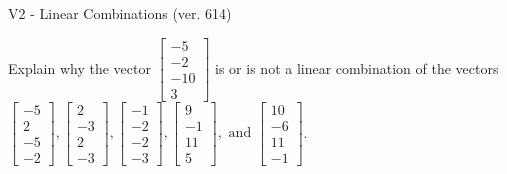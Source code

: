 \begin{exercise}
  \begin{exerciseTitle}V2 - Linear Combinations (ver. 614)\end{exerciseTitle}
  \begin{exerciseStatement}
    Explain why the vector \(\left[\begin{array}{c}
-5 \\
-2 \\
-10 \\
3
\end{array}\right]\)  is or is not a linear 
	combination of the vectors \(\left[\begin{array}{c}
-5 \\
2 \\
-5 \\
-2
\end{array}\right] , \left[\begin{array}{c}
2 \\
-3 \\
2 \\
-3
\end{array}\right] , \left[\begin{array}{c}
-1 \\
-2 \\
-2 \\
-3
\end{array}\right] , \left[\begin{array}{c}
9 \\
-1 \\
11 \\
5
\end{array}\right] , \text{ and } \left[\begin{array}{c}
10 \\
-6 \\
11 \\
-1
\end{array}\right]\).
	



\end{exerciseStatement}
\end{exercise}
